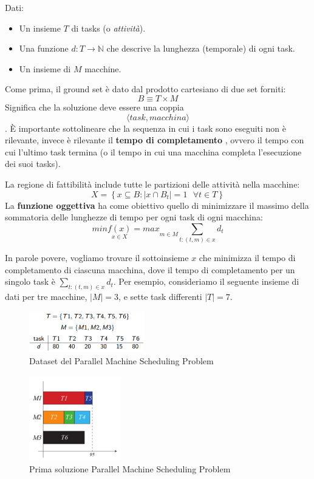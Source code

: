 \documentclass{article}
\begin{document}
Dati:
\begin{itemize}
    \item Un insieme $T$ di tasks (o \textit{attività}).
    \item Una funzione $d:T \rightarrow \mathbb{N}$ che descrive la lunghezza (temporale) di ogni task.
    \item Un insieme di $M$ macchine.
\end{itemize}

Come prima, il ground set è dato dal prodotto cartesiano di due set forniti:
$$B\equiv T\times M$$
Significa che la soluzione deve essere una coppia $$\langle task,macchina\rangle$$. È importante
sottolineare che la sequenza in cui i task sono eseguiti non è rilevante, invece è rilevante il \textbf{tempo di completamento}
, ovvero il tempo con cui l'ultimo task termina (o il tempo in cui una macchina completa l'esecuzione dei suoi tasks).

La regione di fattibilità include tutte le partizioni delle attività nella macchine:
$$X=\left\{ x\subseteq B : |x\cap B_t|=1 \text{ } \forall t \in T \right\} $$
La \textbf{funzione oggettiva} ha come obiettivo quello di minimizzare il massimo della sommatoria delle lunghezze di tempo per ogni task di ogni macchina:
$$min\underset{x\in X}{f(x)}=max\underset{m\in M}{}\sum_{t:(t,m)\in x} d_t$$

In parole povere, vogliamo trovare il sottoinsieme $x$ che minimizza il tempo di completamento di ciascuna
macchina, dove il tempo di completamento per un singolo task è $\sum_{t:(t,m)\in x} d_t$.
\newline
\newline
Per esempio, consideriamo il seguente insieme di dati per tre macchine, $|M|=3$, e sette task differenti $|T|=7$.

\begin{figure}[H]
    \centering
    \includegraphics[width=5cm]{images/dataset_PMSP.png}
    \caption{Dataset del Parallel Machine Scheduling Problem}
    \label{fig:dataset_PMSP}
\end{figure}

\begin{figure}[H]
    \centering
    \includegraphics[width=4cm]{images/sol1_PMSP.png}
    \caption{Prima soluzione Parallel Machine Scheduling Problem}
    \label{fig:sol1_PMSP}
\end{figure}
\end{document}
